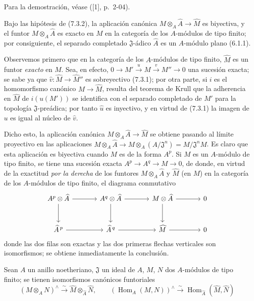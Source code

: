 Para la demostración, véase ([1], p.~2-04).


\begin{corollary}[7.3.3]
\label{0.7.3.3-fr}
Bajo las hipótesis de \textup{(7.3.2)}, la aplicación canónica
$M\otimes_A\widehat A\to\widehat M$ es biyectiva, y el funtor
$M\otimes_A\widehat A$ es exacto en $M$ en la categoría de los $A$-módulos de
tipo finito; por consiguiente, el separado completado $\mathfrak J$-ádico $\widehat A$
es un $A$-módulo plano \textup{(6.1.1)}.
\end{corollary}

Observemos primero que en la categoría de los $A$-módulos de tipo finito,
$\widehat M$ es un funtor \emph{exacto} en $M$. Sea, en efecto,
$0\to M'\xrightarrow{u}M\xrightarrow{v}M''\to0$
una sucesión exacta; se sabe ya que
$\widehat v:\widehat M\to\widehat{M}''$ es sobreyectivo (7.3.1); por otra parte,
si $i$ es el homomorfismo canónico $M\to\widehat M$, resulta del teorema de
Krull que la adherencia en $\widehat M$ de $i(u(M'))$ se identifica con el separado
completado de $M'$ para la topología $\mathfrak J$-preádica; por tanto
$\widehat u$ es inyectivo, y en virtud de (7.3.1) la imagen de $\widehat u$ es
igual al núcleo de $\widehat v$.

Dicho esto, la aplicación canónica $M\otimes_A\widehat A\to\widehat M$
se obtiene pasando al límite proyectivo en las aplicaciones
$M\otimes_A\widehat A\to M\otimes_A(A/\mathfrak J^n)=M/\mathfrak J^nM$.
Es claro que esta aplicación es biyectiva cuando $M$ es de la forma
$A^p$. Si $M$ es un $A$-módulo de tipo finito, se tiene una sucesión exacta
$A^p\to A^q\to M\to0$, de donde, en virtud de la exactitud \emph{por la derecha} de los
funtores $M\otimes_A\widehat A$ y $\widehat M$ (en $M$) en la categoría
de los $A$-módulos de tipo finito, el diagrama conmutativo
\[
\begin{tikzcd}[column sep=large,row sep=large]
  A^p\otimes\widehat A \arrow[r] \arrow[d] &
  A^q\otimes\widehat A \arrow[r] \arrow[d] &
  M\otimes\widehat A \arrow[r] \arrow[d] &
  0 \\
  \widehat A^{\,p} \arrow[r] &
  \widehat A^{\,q} \arrow[r] &
  \widehat M \arrow[r] &
  0
\end{tikzcd}
\]
donde las dos filas son exactas y las dos primeras flechas verticales son
isomorfismos; se obtiene inmediatamente la conclusión.

\begin{corollary}[7.3.4]
\label{0.7.3.4-fr}
Sean $A$ un anillo noetheriano, $\mathfrak J$ un ideal de $A$, $M$, $N$ dos
$A$-módulos de tipo finito; se tienen isomorfismos canónicos funtoriales
\[
  (M\otimes_A N)^\wedge
  \xrightarrow{\sim}
  \widehat M\otimes_{\widehat A}\widehat N,
  \qquad
  (\operatorname{Hom}_A(M,N))^\wedge
  \xrightarrow{\sim}
  \operatorname{Hom}_{\widehat A}(\widehat M,\widehat N)
\]
\end{corollary}

